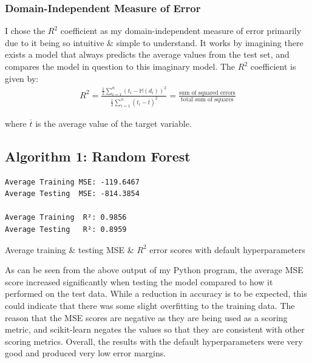 \documentclass[a4paper]{article}
\newenvironment{code}{\captionsetup{type=listing}}{}
\begin{document}
\subsubsection{Domain-Independent Measure of Error}
I chose the $R^2$ coefficient as my domain-independent measure of error primarily due to it being so intuitive \& simple to understand.
It works by imagining there exists a model that always predicts the average values from the test set, and compares the model in question to this imaginary model.
The $R^2$ coefficient is given by:
\begin{align*}
    R^2 = \frac{ \frac{1}{2} \sum^n_{i=1} \left(t_i - \mathbb{M}\left(d_i\right)\right)^2 }{ \frac{1}{2} \sum^n_{i=1} \left(t_i - \overline{t}\right)^2 }
    = \frac{ \text{sum of squared errors} }{ \text{total sum of squares} }
\end{align*}

where $\overline{t}$ is the average value of the target variable.\supercite{glavo}

\subsection{Algorithm 1: Random Forest}
\begin{code}
\begin{verbatim}
Average Training MSE: -119.6467
Average Testing  MSE: -814.3854

Average Training  R²: 0.9856
Average Testing   R²: 0.8959
\end{verbatim}
\caption{Average training \& testing MSE \& $R^2$ error scores with default hyperparameters}
\end{code}

As can be seen from the above output of my Python program, the average MSE score increased significantly when testing the model compared to how it performed on the test data.
While a reduction in accuracy is to be expected, this could indicate that there was some slight overfitting to the training data.
The reason that the MSE scores are negative as they are being used as a scoring metric, and scikit-learn negates the values so that they are consistent with other scoring metrics.
Overall, the results with the default hyperparameters were very good and produced very low error margins.
\end{document}
